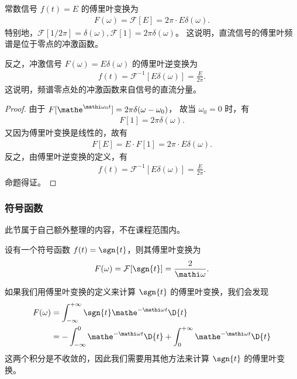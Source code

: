 \begin{theorem}[常数的傅里叶变换]
    常数信号 $f(t) = E$ 的傅里叶变换为
    \begin{align*}
        F(\omega) = \mathcal{F}[E] = 2\pi\cdot E\delta(\omega).
    \end{align*}
    特别地，$\mathcal{F}[1/2\pi] = \delta(\omega), \mathcal{F}[1] = 2\pi\delta(\omega)$。
    这说明，直流信号的傅里叶频谱是位于零点的冲激函数。

    反之，冲激信号 $F(\omega) = E\delta(\omega)$ 的傅里叶逆变换为
    \begin{align*}
        f(t) = \mathcal{F}^{-1}[E\delta(\omega)] = \frac{E}{2\pi}.
    \end{align*}
    这说明，频谱零点处的冲激函数来自信号的直流分量。
\end{theorem}

\begin{proof}
    由于 $F[\mathe^{\mathi \omega_0 t}] = 2\pi\delta(\omega - \omega_0)$，
    故当 $\omega_0 = 0$ 时，有
    \begin{align*}
        F[1] = 2\pi\delta(\omega).
    \end{align*}
    又因为傅里叶变换是线性的，故有
    \begin{align*}
        F[E] = E\cdot F[1] = 2\pi\cdot E\delta(\omega).
    \end{align*}
    反之，由傅里叶逆变换的定义，有
    \begin{align*}
        f(t) = \mathcal{F}^{-1}[E\delta(\omega)] = \frac{E}{2\pi}.
    \end{align*}
    命题得证。
\end{proof}

\subsubsection{符号函数}

\begin{note}
    此节属于自己额外整理的内容，不在课程范围内。
\end{note}

\begin{theorem}
    设有一个符号函数 $f(t) = \sgn{t}$，则其傅里叶变换为
    \begin{align*}
        F(\omega) = \mathcal{F}[\sgn{t}] = \frac{2}{\mathi\omega}.
    \end{align*}
\end{theorem}

\begin{note}
    如果我们用傅里叶变换的定义来计算 $\sgn{t}$ 的傅里叶变换，我们会发现
    \begin{align*}
        F(\omega) & = \int_{-\infty}^{+\infty}\sgn{t}\mathe^{-\mathi\omega t}\D{t} \\
        & = - \int_{-\infty}^{0}\mathe^{-\mathi\omega t}\D{t} + \int_{0}^{+\infty}\mathe^{-\mathi\omega t}\D{t} \\
    \end{align*}
    这两个积分是不收敛的，因此我们需要用其他方法来计算 $\sgn{t}$ 的傅里叶变换。
\end{note}


